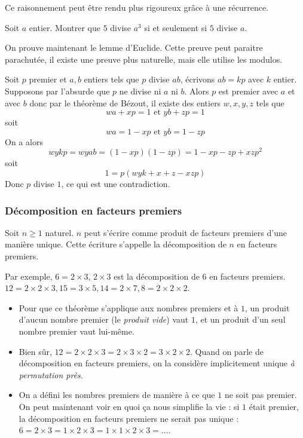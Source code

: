 \begin{rem}
Ce raisonnement peut être rendu plus rigoureux grâce à une récurrence.
\end{rem}


\begin{exo}
Soit $a$ entier.
Montrer que $5$ divise $a^3$ si et seulement si $5$ divise $a$.
\end{exo}


On prouve maintenant le lemme d'Euclide. Cette preuve peut paraitre parachutée, il existe une preuve plus naturelle, mais elle utilise les modulos.

\begin{preuve}
Soit $p$ premier et $a, b$ entiers tels que $p$ divise $ab$, écrivons $ab = kp$ avec $k$ entier. Supposons par l'absurde que $p$ ne divise ni $a$ ni $b$. Alors $p$ est premier avec $a$ et avec $b$ donc par le théorème de Bézout, il existe des entiers $w, x, y, z$ tels que
$$wa + xp = 1\text{ et }yb + zp = 1$$
soit
$$wa = 1 - xp\text{ et }yb = 1 - zp$$
On a alors
$$wykp = wyab = \left(1 - xp\right)\left(1 - zp\right) = 1 - xp - zp + xzp^2$$
soit
$$1 = p(wyk + x + z - xzp)$$
Donc $p$ divise $1$, ce qui est une contradiction.
\end{preuve}


\subsubsection{Décomposition en facteurs premiers}


\begin{thm}
Soit $n\ge 1$ naturel. $n$ peut s'écrire comme produit de facteurs premiers d'une manière unique. Cette écriture s'appelle la décomposition de $n$ en facteurs premiers.
\end{thm}

Par exemple, $6 = 2 \times 3$, $2 \times 3$ est la décomposition de $6$ en facteurs premiers. $12 = 2 \times 2 \times 3, 15 = 3 \times 5, 14 = 2 \times 7, 8 = 2 \times 2 \times 2$.

\begin{rem}
\begin{itemize}
\item Pour que ce théorème s'applique aux nombres premiers et à $1$, un produit d'aucun nombre premier (le \textit{produit vide}) vaut $1$, et un produit d'un seul nombre premier vaut lui-même.
\item Bien sûr, $12 = 2 \times 2 \times 3 = 2 \times 3 \times 2 = 3 \times 2 \times 2$. Quand on parle de décomposition en facteurs premiers, on la considère implicitement unique \textit{à permutation près}.
\item On a défini les nombres premiers de manière à ce que $1$ ne soit pas premier. On peut maintenant voir en quoi ça nous simplifie la vie : si $1$ était premier, la décomposition en facteurs premiers ne serait pas unique : $6 = 2 \times 3 = 1 \times 2 \times 3 = 1 \times 1 \times 2 \times 3 = \dots$.
\end{itemize}
\end{rem}


